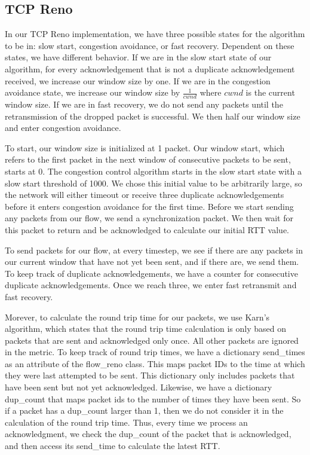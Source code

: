 \documentclass{article}
\begin{document}
\subsection{TCP Reno}

In our TCP Reno implementation, we have three possible states for the algorithm to be in: slow start, congestion avoidance, or fast recovery. Dependent on these states, we have different behavior. If we are in the slow start state of our algorithm, for every acknowledgement that is not a duplicate acknowledgement received, we increase our window size by one. If we are in the congestion avoidance state, we increase our window size by $\frac{1}{cwnd}$ where $cwnd$ is the current window size. If we are in fast recovery, we do not send any packets until the retransmission of the dropped packet is successful. We then half our window size and enter congestion avoidance.

To start, our window size is initialized at 1 packet. Our window start, which refers to the first packet in the next window of consecutive packets to be sent, starts at 0. The congestion control algorithm starts in the slow start state with a slow start threshold of 1000. We chose this initial value to be arbitrarily large, so the network will either timeout or receive three duplicate acknowledgements before it enters congestion avoidance for the first time. Before we start sending any packets from our flow, we send a synchronization packet. We then wait for this packet to return and be acknowledged to calculate our initial RTT value.

To send packets for our flow, at every timestep, we see if there are any packets in our current window that have not yet been sent, and if there are, we send them. To keep track of duplicate acknowledgements, we have a counter for consecutive duplicate acknowledgements. Once we reach three, we enter fast retransmit and fast recovery. 

Morever, to calculate the round trip time for our packets, we use Karn's algorithm, which states that the round trip time calculation is only based on packets that are sent and acknowledged only once. All other packets are ignored in the metric. To keep track of round trip times, we have a dictionary send\_times as an attribute of the flow\_reno class. This maps packet IDs to the time at which they were last attempted to be sent. This dictionary only includes packets that have been sent but not yet acknowledged. Likewise, we have a dictionary dup\_count that maps packet ids to the number of times they have been sent. So if a packet has a dup\_count larger than 1, then we do not consider it in the calculation of the round trip time. Thus, every time we process an acknowledgment, we check the dup\_count of the packet that is acknowledged, and then access its send\_time to calculate the latest RTT. 
\end{document}
